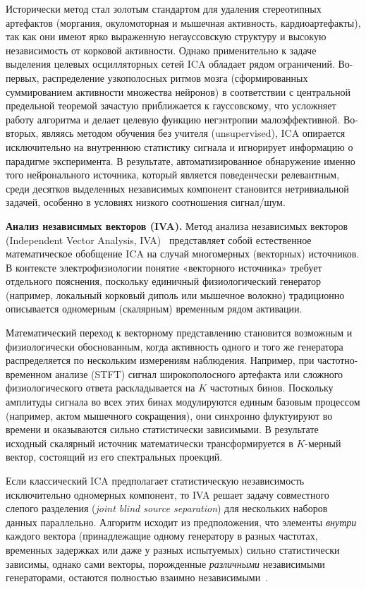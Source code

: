 Исторически метод стал золотым стандартом для удаления стереотипных артефактов (моргания, окуломоторная и мышечная активность, кардиоартефакты), так как они имеют ярко выраженную негауссовскую структуру и высокую независимость от корковой активности. Однако применительно к задаче выделения целевых осцилляторных сетей ICA обладает рядом ограничений. Во-первых, распределение узкополосных ритмов мозга (сформированных суммированием активности множества нейронов) в соответствии с центральной предельной теоремой зачастую приближается к гауссовскому, что усложняет работу алгоритма и делает целевую функцию негэнтропии малоэффективной. Во-вторых, являясь методом обучения без учителя (unsupervised), ICA опирается исключительно на внутреннюю статистику сигнала и игнорирует информацию о парадигме эксперимента. В результате, автоматизированное обнаружение именно того нейронального источника, который является поведенчески релевантным, среди десятков выделенных независимых компонент становится нетривиальной задачей, особенно в условиях низкого соотношения сигнал/шум.

\textbf{Анализ независимых векторов (IVA).}
Метод анализа независимых векторов (Independent Vector Analysis, IVA)~\cite{Kim2006IVA, Chen2017} представляет собой естественное математическое обобщение ICA на случай многомерных (векторных) источников. В контексте электрофизиологии понятие «векторного источника» требует отдельного пояснения, поскольку единичный физиологический генератор (например, локальный корковый диполь или мышечное волокно) традиционно описывается одномерным (скалярным) временным рядом активации. 

Математический переход к векторному представлению становится возможным и физиологически обоснованным, когда активность одного и того же генератора распределяется по нескольким измерениям наблюдения. Например, при частотно-временном анализе (STFT) сигнал широкополосного артефакта или сложного физиологического ответа раскладывается на $K$ частотных бинов. Поскольку амплитуды сигнала во всех этих бинах модулируются единым базовым процессом (например, актом мышечного сокращения), они синхронно флуктуируют во времени и оказываются сильно статистически зависимыми. В результате исходный скалярный источник математически трансформируется в $K$-мерный вектор, состоящий из его спектральных проекций. 

Если классический ICA предполагает статистическую независимость исключительно одномерных компонент, то IVA решает задачу совместного слепого разделения (\textit{joint blind source separation}) для нескольких наборов данных параллельно. Алгоритм исходит из предположения, что элементы \textit{внутри} каждого вектора (принадлежащие одному генератору в разных частотах, временных задержках или даже у разных испытуемых) сильно статистически зависимы, однако сами векторы, порожденные \textit{различными} независимыми генераторами, остаются полностью взаимно независимыми~\cite{Kim2006IVA}.

